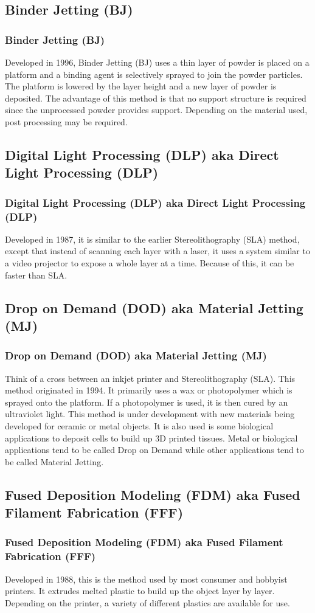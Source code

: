\documentclass[english,10pt]{beamer}
\begin{document}
\subsection{Binder Jetting (BJ)}
\begin{frame}
  \frametitle{Binder Jetting (BJ)}
  Developed in 1996, Binder Jetting (BJ) uses a thin layer of powder is placed on a platform and a binding agent is selectively sprayed to join the powder particles.  The platform is lowered by the layer height and a new layer of powder is deposited.  The advantage of this method is that no support structure is required since the unprocessed powder provides support.  Depending on the material used, post processing may be required.
\end{frame}

\subsection{Digital Light Processing (DLP) aka Direct Light Processing (DLP)}
\begin{frame}
  \frametitle{Digital Light Processing (DLP) aka Direct Light Processing (DLP)}
  Developed in 1987, it is similar to the earlier Stereolithography (SLA) method, except that instead of scanning each layer with a laser, it uses a system similar to a video projector to expose a whole layer at a time.  Because of this, it can be faster than SLA.
\end{frame}

\subsection{Drop on Demand (DOD) aka Material Jetting (MJ)}
\begin{frame}
  \frametitle{Drop on Demand (DOD) aka Material Jetting (MJ)}
  Think of a cross between an inkjet printer and Stereolithography (SLA).  This method originated in 1994.  It primarily uses a wax or photopolymer which is sprayed onto the platform.  If a photopolymer is used, it is then cured by an ultraviolet light.  This method is under development with new materials being developed for ceramic or metal objects.  It is also used is some biological applications to deposit cells to build up 3D printed tissues.  Metal or biological applications tend to be called Drop on Demand while other applications tend to be called Material Jetting.
\end{frame}

\subsection{Fused Deposition Modeling (FDM) aka Fused Filament Fabrication (FFF)}
\begin{frame}
  \frametitle{Fused Deposition Modeling (FDM) aka Fused Filament Fabrication (FFF)}
  Developed in 1988, this is the method used by most consumer and hobbyist printers.  It extrudes melted plastic to build up the object layer by layer.  Depending on the printer, a variety of different plastics are available for use.
\end{frame}
\end{document}
